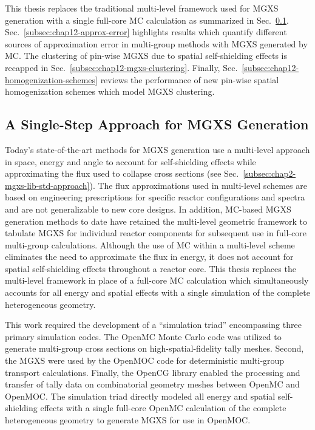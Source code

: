 This thesis replaces the traditional multi-level framework used for \ac{MGXS} generation with a single full-core MC calculation as summarized in Sec.~\ref{subsec:chap12-single-step}. Sec.~\ref{subsec:chap12-approx-error} highlights results which quantify different sources of approximation error in multi-group methods with \ac{MGXS} generated by \ac{MC}. The clustering of pin-wise \ac{MGXS} due to spatial self-shielding effects is recapped in Sec.~\ref{subsec:chap12-mgxs-clustering}. Finally, Sec.~\ref{subsec:chap12-homogenization-schemes} reviews the performance of new pin-wise spatial homogenization schemes which model \ac{MGXS} clustering.

\subsection{A Single-Step Approach for MGXS Generation}
\label{subsec:chap12-single-step}

Today's state-of-the-art methods for \ac{MGXS} generation use a multi-level approach in space, energy and angle to account for self-shielding effects while approximating the flux used to collapse cross sections (see Sec.~\ref{subsec:chap2-mgxs-lib-std-approach}). The flux approximations used in multi-level schemes are based on engineering prescriptions for specific reactor configurations and spectra and are not generalizable to new core designs. In addition, \ac{MC}-based \ac{MGXS} generation methods to date have retained the multi-level geometric framework to tabulate MGXS for individual reactor components for subsequent use in full-core multi-group calculations. Although the use of MC within a multi-level scheme eliminates the need to approximate the flux in energy, it does not account for spatial self-shielding effects throughout a reactor core. This thesis replaces the multi-level framework in place of a full-core \ac{MC} calculation which simultaneously accounts for all energy and spatial effects with a single simulation of the complete heterogeneous geometry.

This work required the development of a ``simulation triad'' encompassing three primary simulation codes. The OpenMC Monte Carlo code was utilized to generate multi-group cross sections on high-spatial-fidelity tally meshes. Second, the \ac{MGXS} were used by the OpenMOC code for deterministic multi-group transport calculations. Finally, the OpenCG library enabled the processing and transfer of tally data on combinatorial geometry meshes between OpenMC and OpenMOC. The simulation triad directly modeled all energy and spatial self-shielding effects with a single full-core OpenMC calculation of the complete heterogeneous geometry to generate \ac{MGXS} for use in OpenMOC.

